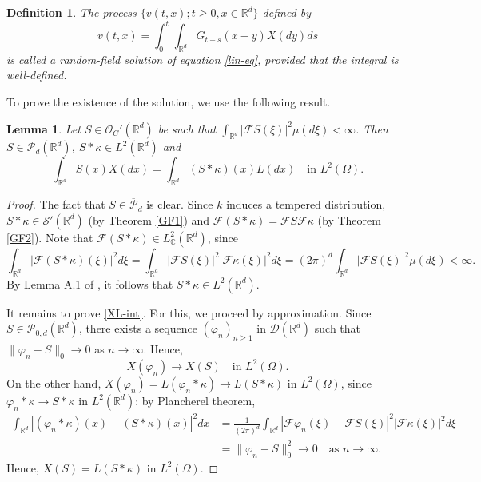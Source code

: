 \documentclass[12pt]{article}
\newtheorem{lemma}[theorem]{Lemma}
\newtheorem{definition}[theorem]{Definition}
\def\cD{\mathcal{D}}
\def\cF{\mathcal{F}}
\def\cO{\mathcal{O}}
\def\cP{\mathcal{P}}
\def\cS{\mathcal{S}}
\def\bC{\mathbb{C}}
\def\bR{\mathbb{R}}
\def\k{\kappa}
\begin{document}
\begin{definition}
{\rm
The process $\{v(t,x);t\geq 0,x\in \bR^d\}$ defined by
\begin{equation}
\label{defi-v}
v(t,x)=\int_0^t \int_{\bR^d}G_{t-s}(x-y) X(dy)ds
\end{equation}
is called a {\em random-field solution} of equation \eqref{lin-eq}, provided that the integral is well-defined. }
\end{definition}



To prove the existence of the solution, we use the following result. 
\begin{lemma}
\label{S-lem}
Let $S \in \cO_{C}'(\bR^d)$ be such that $\int_{\bR^d}|\cF S(\xi)|^2 \mu(d\xi)<\infty$. Then $S \in \overline{\cP}_{d}(\bR^d)$, $S * \k \in L^2(\bR^d)$ and 
\begin{equation}
\label{XL-int}
\int_{\bR^d}S(x)X(dx)=\int_{\bR^d}(S*\k)(x)L(dx) \quad \mbox{in $L^2(\Omega)$.}
\end{equation}
\end{lemma}

\begin{proof} The fact that $S \in \overline{\cP}_{d}$ is clear. Since $k$ induces a tempered distribution, $S*\k \in \cS'(\bR^d)$ (by Theorem \ref{GF1}) and $\cF(S*\k)=\cF S \cF \k$ (by Theorem \ref{GF2}). Note that $\cF(S*\k)\in L^2_{\bC}(\bR^d)$, since
\[
\int_{\bR^d}|\cF(S*\k)(\xi)|^2 d\xi=\int_{\bR^d}|\cF S(\xi)|^2 |\cF \k(\xi)|^2 d\xi=(2\pi)^d
\int_{\bR^d}|\cF S(\xi)|^2 \mu(d\xi)<\infty.
\]
By Lemma A.1 of \cite{BJ26}, it follows that $S*\k \in L^2(\bR^d)$.

It remains to prove \eqref{XL-int}. For this, we proceed by approximation. Since $S \in \cP_{0,d}(\bR^d)$, there exists a sequence $(\varphi_n)_{n\geq 1}$ in $\cD(\bR^d)$ such that $\|\varphi_n-S\|_0 \to 0$ as $n \to \infty$. Hence, 
\[
X(\varphi_n) \to X(S) \quad \mbox{in $L^2(\Omega)$}.
\]
On the other hand, $X(\varphi_n)=L(\varphi_n*\k) \to L(S *\k)$ in $L^2(\Omega)$, since
$\varphi_n *\k \to S *\k$ in $L^2(\bR^d)$: by Plancherel theorem,
\begin{align*}
\int_{\bR^d}|(\varphi_n* \k)(x) -(S* \k)(x)|^2dx&=\frac{1}{(2\pi)^d} \int_{\bR^d} |\cF \varphi_n(\xi)-\cF S(\xi)|^2 |\cF \k(\xi)|^2 d\xi \\
&= \|\varphi_n-S\|_0^2 \to 0 \quad \mbox{as $n\to \infty$}.
\end{align*}
Hence, $X(S)=L(S*\k)$ in $L^2(\Omega)$.
\end{proof}
\end{document}
